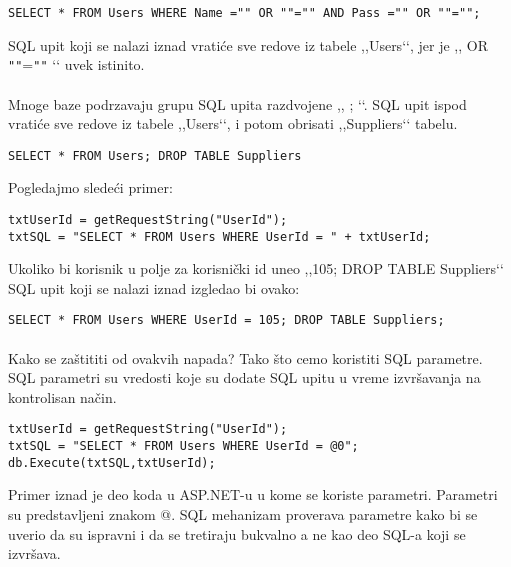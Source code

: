 \documentclass[a4paper]{article}
\begin{document}
\begin{verbatim}
SELECT * FROM Users WHERE Name ="" OR ""="" AND Pass ="" OR ""="";
\end{verbatim}

\noindent SQL upit koji se nalazi iznad vratiće sve redove iz tabele ,,Users‘‘, jer je ,, OR \texttt{"}\texttt{"}=\texttt{"}\texttt{"} ‘‘ uvek istinito. 

\paragraph{}
Mnoge baze podrzavaju grupu SQL upita razdvojene ,, ; ‘‘. SQL upit ispod vratiće sve redove iz tabele ,,Users‘‘, i potom obrisati ,,Suppliers‘‘ tabelu.

\begin{verbatim}
SELECT * FROM Users; DROP TABLE Suppliers
\end{verbatim}

\noindent Pogledajmo sledeći primer:

\begin{verbatim}
txtUserId = getRequestString("UserId");
txtSQL = "SELECT * FROM Users WHERE UserId = " + txtUserId;
\end{verbatim}

\noindent Ukoliko bi korisnik u polje za korisnički id uneo ,,105; DROP TABLE Suppliers‘‘ SQL upit koji se nalazi iznad izgledao bi ovako:

\begin{verbatim}
SELECT * FROM Users WHERE UserId = 105; DROP TABLE Suppliers; 
\end{verbatim}

\paragraph{}
Kako se zaštititi od ovakvih napada? Tako što cemo koristiti SQL parametre. SQL parametri su vredosti koje su dodate SQL upitu u vreme izvršavanja na kontrolisan način. 

\begin{verbatim}
txtUserId = getRequestString("UserId");
txtSQL = "SELECT * FROM Users WHERE UserId = @0";
db.Execute(txtSQL,txtUserId);
\end{verbatim}

\noindent Primer iznad je deo koda u ASP.NET-u u kome se koriste parametri. Parametri su predstavljeni znakom @. SQL mehanizam proverava parametre kako bi se uverio da su ispravni i da se tretiraju bukvalno a ne kao deo SQL-a koji se izvršava.
\end{document}
